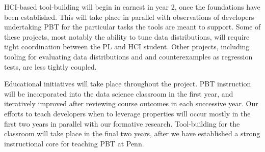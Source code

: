 HCI-based tool-building will begin in earnest in year 2, once the
foundations have been established. This will take place in parallel with observations
of developers undertaking PBT for the particular tasks the tools are meant to
support. Some of these projects, most notably the ability to tune data
distributions, will require tight coordination between the PL and HCI student.
Other projects, including tooling for evaluating data distributions and and
counterexamples as regression tests, are less tightly coupled.

Educational initiatives will take place throughout the project. PBT
instruction will be incorporated into the data science classroom in the
first year, and iteratively improved after reviewing course outcomes in each
successive year. Our efforts to teach developers when to leverage properties will
occur mostly in the first two years in parallel with our formative
research. Tool-building for the classroom will take place in the final two
years, after we have established a strong instructional core for teaching PBT at
Penn.

